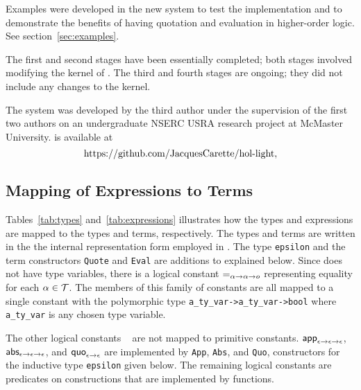 \documentclass[fleqn]{llncs}
\begin{document}
  \item Examples were developed in the new system to test the
    implementation and to demonstrate the benefits of having quotation
    and evaluation in higher-order logic.  See section~\ref{sec:examples}.

\ee

\noindent
The first and second stages have been essentially completed; both
stages involved modifying the kernel of {\HL}.  The third and fourth
stages are ongoing; they did not include any changes to the {\HL}
kernel.

The {\HLQE} system was developed by the third author under the
supervision of the first two authors on an undergraduate NSERC USRA
research project at McMaster University.  {\HLQE} is available at
\[\mbox{https://github.com/JacquesCarette/hol-light},\]

\subsection{Mapping of {\churchqe} Expressions to {\HOL} Terms}\label{subsec:mapping}

Tables~\ref{tab:types} and~\ref{tab:expressions} illustrates how the
{\churchqe} types and expressions are mapped to the {\HOL} types and
terms, respectively.  The {\HOL} types and terms are written in the
the internal representation form employed in {\HLQE}.  The type
\texttt{epsilon} and the term constructors \texttt{Quote} and
\texttt{Eval} are additions to {\HL} explained below.  Since
{\churchqe} does not have type variables, there is a logical constant
$\mbox{\sf =}_{\alpha \rightarrow \alpha \rightarrow o}$ representing equality
for each $\alpha \in \mbox{$\cal T$}$.  The members of this family of constants
are all mapped to a single {\HOL} constant with the polymorphic type
\texttt{a\_ty\_var->a\_ty\_var->bool} where \texttt{a\_ty\_var} is any
chosen {\HOL} type variable.  

The other logical constants {\churchqe}~\cite[Table 1]{FarmerArxiv16}
are not mapped to primitive {\HOL} constants.  $\mbox{\sf app}_{\epsilon
  \rightarrow \epsilon \rightarrow \epsilon}$, $\mbox{\sf abs}_{\epsilon \rightarrow
  \epsilon \rightarrow \epsilon}$, and $\mbox{\sf quo}_{\epsilon \rightarrow
  \epsilon}$ are implemented by \texttt{App}, \texttt{Abs}, and
\texttt{Quo}, constructors for the inductive type \texttt{epsilon}
given below.  The remaining logical constants are predicates on
constructions that are implemented by {\HOL} functions.
\end{document}
